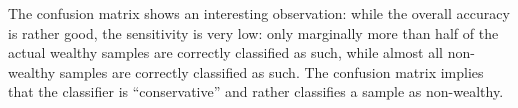 The confusion matrix shows an interesting observation: while the overall accuracy is rather good, the sensitivity is very low: only marginally more than half of the actual wealthy samples are correctly classified as such, while almost all non-wealthy samples are correctly classified as such. The confusion matrix implies that the classifier is ``conservative'' and rather classifies a sample as non-wealthy. 